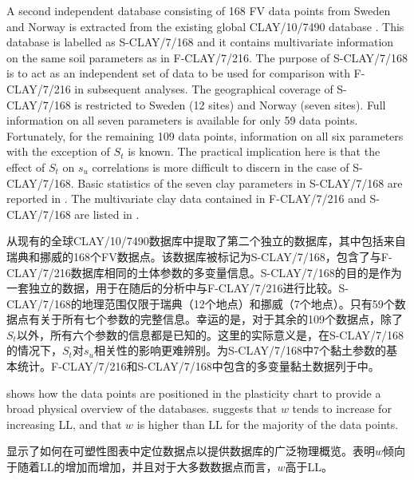\begin{ParaColumn}
    
    \switchcolumn*

    A second independent database consisting of 168 FV data points from Sweden and Norway is extracted from the existing global CLAY/10/7490 database \citep{Ching2014663}. This database is labelled as S-CLAY/7/168 and it contains multivariate information on the same soil parameters as in F-CLAY/7/216. The purpose of S-CLAY/7/168 is to act as an independent set of data to be used for comparison with F-CLAY/7/216 in subsequent analyses. The geographical coverage of S-CLAY/7/168 is restricted to Sweden (12 sites) and Norway (seven sites). Full information on all seven parameters is available for only 59 data points. Fortunately, for the remaining 109 data points, information on all six parameters with the exception of $S_t$ is known. The practical implication here is that the effect of $S_t$ on $s_u$ correlations is more difficult to discern in the case of S-CLAY/7/168. Basic statistics of the seven clay parameters in S-CLAY/7/168 are reported in . The multivariate clay data contained in F-CLAY/7/216 and S-CLAY/7/168 are listed in .

    \switchcolumn

    从现有的全球CLAY/10/7490数据库\citep{Ching2014663}中提取了第二个独立的数据库，其中包括来自瑞典和挪威的168个FV数据点。该数据库被标记为S-CLAY/7/168，包含了与F-CLAY/7/216数据库相同的土体参数的多变量信息。S-CLAY/7/168的目的是作为一套独立的数据，用于在随后的分析中与F-CLAY/7/216进行比较。S-CLAY/7/168的地理范围仅限于瑞典（12个地点）和挪威（7个地点）。只有59个数据点有关于所有七个参数的完整信息。幸运的是，对于其余的109个数据点，除了$S_t$以外，所有六个参数的信息都是已知的。这里的实际意义是，在S-CLAY/7/168的情况下，$S_t$对$s_u$相关性的影响更难辨别。为S-CLAY/7/168中7个黏土参数的基本统计。F-CLAY/7/216和S-CLAY/7/168中包含的多变量黏土数据列于中。

    \switchcolumn*

     shows how the data points are positioned in the plasticity chart to provide a broad physical overview of the databases.  suggests that $w$ tends to increase for increasing LL, and that $w$ is higher than LL for the majority of the data points.

    \switchcolumn

    显示了如何在可塑性图表中定位数据点以提供数据库的广泛物理概览。表明$w$倾向于随着LL的增加而增加，并且对于大多数数据点而言，$w$高于LL。
    

\end{ParaColumn}
